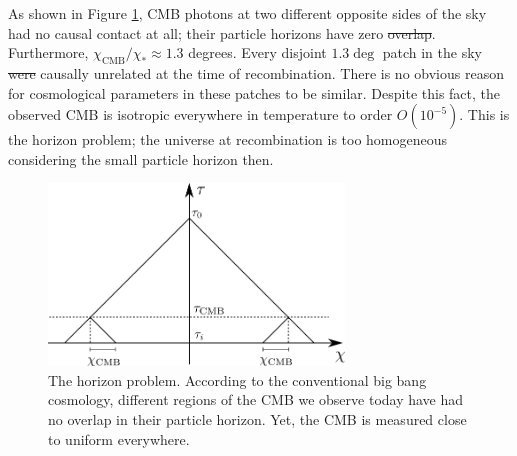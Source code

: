 \documentclass[a4paper,12pt,times,custombib,print,index]{Classes/PhDThesisPSnPDF} %
\providecommand{\DIFadd}[1]{{\protect\color{blue}\uwave{#1}}} %
\providecommand{\DIFdel}[1]{{\protect\color{red}\sout{#1}}}                      %
\providecommand{\DIFaddbegin}{} %
\providecommand{\DIFaddend}{} %
\providecommand{\DIFdelbegin}{} %
\providecommand{\DIFdelend}{} %
\newcommand{\DIFscaledelfig}{0.5}
\newlength{\DIFdelgraphicswidth} %
\newlength{\DIFdelgraphicsheight} %
\newcommand{\DIFaddincludegraphics}[2][]{{\color{blue}\fbox{\DIFOincludegraphics[#1]{#2}}}} %
\newcommand{\DIFdelincludegraphics}[2][]{%
\sbox{\DIFdelgraphicsbox}{\DIFOincludegraphics[#1]{#2}}%
\settoboxwidth{\DIFdelgraphicswidth}{\DIFdelgraphicsbox} %
\settoboxtotalheight{\DIFdelgraphicsheight}{\DIFdelgraphicsbox} %
\scalebox{\DIFscaledelfig}{%
\parbox[b]{\DIFdelgraphicswidth}{\usebox{\DIFdelgraphicsbox}\\[-\baselineskip] \rule{\DIFdelgraphicswidth}{0em}}\llap{\resizebox{\DIFdelgraphicswidth}{\DIFdelgraphicsheight}{%
\setlength{\unitlength}{\DIFdelgraphicswidth}%
\begin{picture}(1,1)%
\thicklines\linethickness{2pt} %
{\color[rgb]{1,0,0}\put(0,0){\framebox(1,1){}}}%
{\color[rgb]{1,0,0}\put(0,0){\line( 1,1){1}}}%
{\color[rgb]{1,0,0}\put(0,1){\line(1,-1){1}}}%
\end{picture}%
}\hspace*{3pt}}} %
} %
\DeclareRobustCommand{\DIFaddbegin}{\DIFOaddbegin \let\includegraphics\DIFaddincludegraphics} %
\DeclareRobustCommand{\DIFaddend}{\DIFOaddend \let\includegraphics\DIFOincludegraphics} %
\DeclareRobustCommand{\DIFdelbegin}{\DIFOdelbegin \let\includegraphics\DIFdelincludegraphics} %
\DeclareRobustCommand{\DIFdelend}{\DIFOaddend \let\includegraphics\DIFOincludegraphics} %
\begin{document}
As shown in Figure \ref{fig:horizon_problem}, CMB photons at two different opposite sides of the sky had no causal contact at all; their particle horizons have zero \DIFdelbegin \DIFdel{overlap}\DIFdelend \DIFaddbegin \DIFadd{overlaps}\DIFaddend . Furthermore, $\chi_\text{CMB}/\chi_* \approx 1.3$ degrees. Every disjoint $1.3\deg$ patch in the sky \DIFdelbegin \DIFdel{were }\DIFdelend \DIFaddbegin \DIFadd{was }\DIFaddend causally unrelated at the time of recombination. There is no obvious reason for cosmological parameters in these patches to be similar. Despite this fact, the observed CMB is isotropic everywhere in temperature to order $O(10^{-5})$. This is the horizon problem; the universe at recombination is too homogeneous considering the small particle horizon then.
\begin{figure}[htbp!] 
	\centering    
	\includegraphics[width=0.7\textwidth]{horizon_problem.png}
	\caption{The horizon problem. According to the conventional big bang cosmology, different regions of the CMB we observe today have had no overlap in their particle horizon. Yet, the CMB is measured close to uniform everywhere.}
	\label{fig:horizon_problem}
\end{figure}
\end{document}

